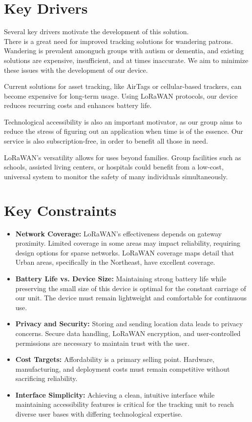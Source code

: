 \section{Key Drivers}
Several key drivers motivate the development of this solution.  
\\

There is a great need for improved tracking solutions for wandering patrons. Wandering is prevalent amonguch groups with autism or dementia, and existing solutions are expensive, insufficient, and at times inaccurate. We aim to minimize these issues with the development of our device.

Current solutions for asset tracking, like AirTags or cellular-based trackers, can become expensive for long-term usage. Using LoRaWAN protocols, our device reduces recurring costs and enhances battery life.

Technological accessibility is also an important motivator, as our group aims to reduce the stress of figuring out an application when time is of the essence. Our service is also subscription-free, in order to benefit all those in need.

LoRaWAN’s versatility allows for uses beyond families. Group facilities such as schools, assisted living centers, or hospitals could benefit from a low-cost, universal system to monitor the safety of many individuals simultaneously.

\section{Key Constraints}

\begin{itemize}
  \item \textbf{Network Coverage:} LoRaWAN’s effectiveness depends on gateway proximity. Limited coverage in some areas may impact reliability, requiring design options for sparse networks. LoRaWAN coverage maps detail that Urban areas, specifically in the Northeast, have excellent coverage.
  \item \textbf{Battery Life vs. Device Size:} Maintaining strong battery life while preserving the small size of this device is optimal for the constant carriage of our unit. The device must remain lightweight and comfortable for continuous use.
  \item \textbf{Privacy and Security:} Storing and sending location data leads to privacy concerns. Secure data handling, LoRaWAN encryption, and user-controlled permissions are necessary to maintain trust with the user.
  \item \textbf{Cost Targets:} Affordability is a primary selling point. Hardware, manufacturing, and deployment costs must remain competitive without sacrificing reliability.
  \item \textbf{Interface Simplicity:} Achieving a clean, intuitive interface while maintaining accessibility features is critical for the tracking unit to reach diverse user bases with differing technological expertise.
\end{itemize}
